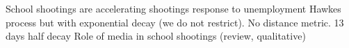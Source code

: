 \cite{Pah2017}
School shootings are accelerating
shootings response to unemployment
\cite{towers2015a}
Hawkes process but with exponential decay (we do not restrict). No distance metric.
13 days half decay
\cite{Muschert2017}
Role of media in school shootings (review, qualitative)

	


